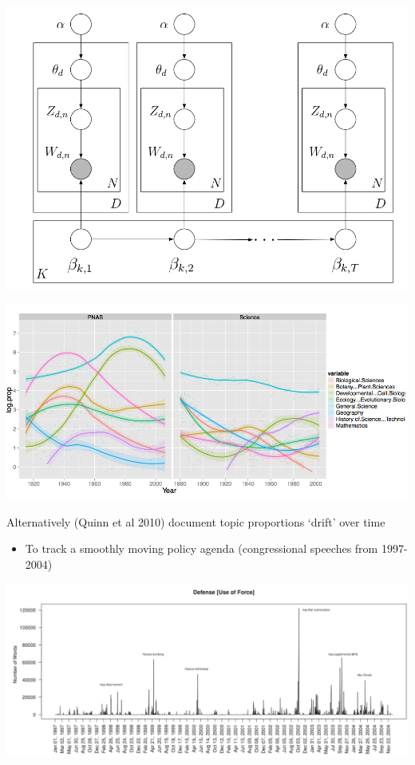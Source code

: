 \documentclass[11pt,compress,professionalfonts]{beamer}
\newcommand{\ita}{\begin{itemize}}
\newcommand{\itm}{\item[]}
\newcommand{\itz}{\end{itemize}}
\begin{document}
\centerline{\includegraphics[scale=.8]{pictures/blei-dynamic}}


\centerline{\includegraphics[scale=.7]{pictures/dynamics}}


Alternatively (Quinn et al 2010) document topic proportions `drift' over time 
\ita
\itm To track a smoothly moving policy agenda (congressional speeches from 1997-2004)
\itz

\centerline{\includegraphics[scale=.5]{pictures/defence-topic-quinn}}
\end{document}
